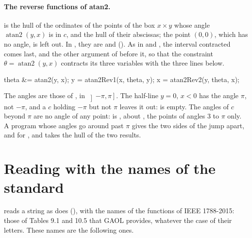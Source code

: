 \documentclass[12pt,a4paper,twoside,openright]{book}
\begin{document}
\paragraph{The reverse functions of atan2.}
%
 is the hull of the ordinates of the points of the
box $x\times y$ whose angle $\operatorname{atan2}(y,x)$ is in $c$, and
 the hull of their abscissas; the point $(0,0)$,
which has no angle, is left out. In , they are
 and 
().\newinvfive{} As in  and
, the interval contracted comes last, and the other argument
of  before it, so that the constraint
$\theta=\operatorname{atan2}(y,x)$ contracts its three variables with the
three lines below.
\begin{example}
theta &= atan2(y, x);
y = atan2Rev1(x, theta, y);
x = atan2Rev2(y, theta, x);
\end{example}

\noindent
The angles are those of , in $\left]-\pi,\pi\right]$. The
half-line $y=0$, $x<0$ has the angle $\pi$, not $-\pi$, and a $c$ holding
$-\pi$ but not $\pi$ leaves it out: 
is empty. The angles of $c$ beyond $\pi$ are no angle of any point:
 is , about
, the points of angles 3 to $\pi$ only. A program whose
angles go around past $\pi$ gives the two sides of the jump apart,
 and  for , and takes the hull of
the two results.

\section{Reading with the names of the standard}\label{sec:ieee1788-text}
%

 reads a string as 
does (), with the names of the functions of IEEE
1788-2015: those of Tables 9.1 and 10.5 that GAOL provides, whatever the case
of their letters.\newinvfive{} These names are the following ones.
\end{document}
